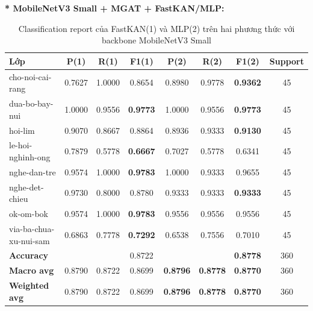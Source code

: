 \textbf{* MobileNetV3 Small + MGAT + FastKAN/MLP:}
\begin{table}[H]
\centering
\renewcommand{\arraystretch}{1.08}
\caption{\centering Classification report của FastKAN(1) và MLP(2) trên hai phương thức với backbone MobileNetV3 Small}
\begin{tabular}{lccccccc}
\hline \textbf{Lớp} & \textbf{P(1)} & \textbf{R(1)} & \textbf{F1(1)} & \textbf{P(2)} & \textbf{R(2)} & \textbf{F1(2)} & \textbf{Support} \\ \hline

cho-noi-cai-rang 
& 0.7627 & 1.0000 & 0.8654 
& 0.8980 & 0.9778 & \textbf{0.9362} & 45 \\

dua-bo-bay-nui
& 1.0000 & 0.9556 & \textbf{0.9773} 
& 1.0000 & 0.9556 & \textbf{0.9773} & 45 \\

hoi-lim
& 0.9070 & 0.8667 & 0.8864 
& 0.8936 & 0.9333 & \textbf{0.9130} & 45 \\

le-hoi-nghinh-ong
& 0.7879 & 0.5778 & \textbf{0.6667} 
& 0.7027 & 0.5778 & 0.6341 & 45 \\

nghe-dan-tre
& 0.9574 & 1.0000 & \textbf{0.9783} 
& 1.0000 & 0.9333 & 0.9655 & 45 \\

nghe-det-chieu
& 0.9730 & 0.8000 & 0.8780 
& 0.9333 & 0.9333 & \textbf{0.9333} & 45 \\

ok-om-bok
& 0.9574 & 1.0000 & \textbf{0.9783} 
& 0.9556 & 0.9556 & 0.9556 & 45 \\

via-ba-chua-xu-nui-sam
& 0.6863 & 0.7778 & \textbf{0.7292} 
& 0.6538 & 0.7556 & 0.7010 & 45 \\
\hline

\textbf{Accuracy}
& & & 0.8722
& & & \textbf{0.8778} & 360 \\

\textbf{Macro avg}
& 0.8790 & 0.8722 & 0.8699 
& \textbf{0.8796} & \textbf{0.8778} & \textbf{0.8770} & 360 \\

\textbf{Weighted avg}
& 0.8790 & 0.8722 & 0.8699 
& \textbf{0.8796} & \textbf{0.8778} & \textbf{0.8770} & 360 \\
\hline
\end{tabular}
\end{table}
\newpage
